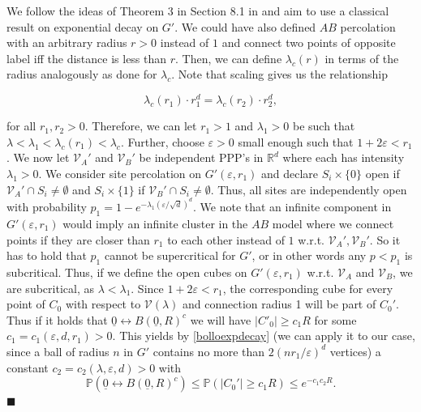 \documentclass[11pt]{article}%
\newenvironment{proof}{\vspace{1ex}\noindent{\bf Proof.}}{\hspace*{\fill}$\blacksquare$\vspace{1ex}}
\newcommand{\eps}{\varepsilon}
\newcommand{\RR}{\mathbb{R}}
\newcommand{\Pro}{\mathbb{P}}
\newcommand{\typ}{\underline{0}}
\begin{document}
	\begin{proof}
		We follow the ideas of Theorem 3 in Section 8.1 in \cite{bollobas2006percolation} and aim to use a 
		classical result on exponential decay on $ G' $. 
		We could have also defined $AB$ percolation with an arbitrary radius $r>0$ instead of $1$ and connect 
		two points of opposite label iff the distance is less than $r$. 
		Then, we can define $\lambda_c(r)$ in terms of the radius analogously as done for $\lambda_c$. 
		Note that scaling gives us the relationship 
		
		$$ \lambda_c(r_1)\cdot r_1^d=\lambda_c(r_2)\cdot r_2^d, $$
		
		\noindent 
		for all $r_1,r_2>0$.
        Therefore, we can let $ r_1>1 $ and $ \lambda_1>0 $ be such that $ \lambda<\lambda_1<\lambda_c(r_1)<\lambda_c$. Further, choose $ \eps>0 $ small enough such that $ 1+2\eps<r_1 $. We now let $ \mathcal{V}_A' $ and $ \mathcal{V}_B' $ be independent PPP's in $ \RR^d $ where each has intensity $ \lambda_1>0 $. We consider site percolation on $ G'(\eps,r_1)$ and declare $ S_{i}\times\{0\}$ open if $ \mathcal{V}_A'\cap S_{i}\neq \emptyset $ and $ S_{i}\times\{1\} $ if $ \mathcal{V}_B'\cap S_{i}\neq \emptyset $. Thus, all sites are independently open with probability $ p_1=1-e^{-\lambda_1(\eps/\sqrt{d})^d} $. We note that an infinite component in $ G'(\eps,r_1) $ would imply an infinite cluster in the $AB$ model where we connect points if they are closer than $ r_1 $ to each other instead of $1$ w.r.t. $\mathcal{V}_A',\mathcal{V}_B'$. So it has to hold that $ p_1 $ cannot be supercritical for $ G' $, or in other words any $ p<p_1 $ is subcritical. Thus, if we define the open cubes on $ G'(\eps,r_1) $ w.r.t. $ \mathcal{V}_A $ and $ \mathcal{V}_B $, we are subcritical, as $ \lambda<\lambda_1 $. Since $ 1+2\eps<r_1 $, the corresponding cube for every point of $ C_0 $ with respect to $ \mathcal{V}(\lambda) $ and connection radius 1 will be part of $ C_0' $. Thus if it holds that $\typ\longleftrightarrow B(\typ,R)^c$ we will have $|C'_0|\geq c_1 R$ for some $c_1=c_1(\eps,d,r_1)>0$. This yields by \cref{bolloexpdecay} (we can apply it to our case, since a ball of radius $ n $ in $ G' $ contains no more than $ 2(nr_1/\eps)^d  $ vertices) a constant $c_2=c_2(\lambda,\eps,d)>0$ with
        \begin{equation*}
            \Pro(\typ\longleftrightarrow B(\typ,R)^c)\leq \Pro(|C_0'|\geq c_1R)\leq e^{-c_1c_2R}.
        \end{equation*}
	\end{proof}
	
\end{document}
